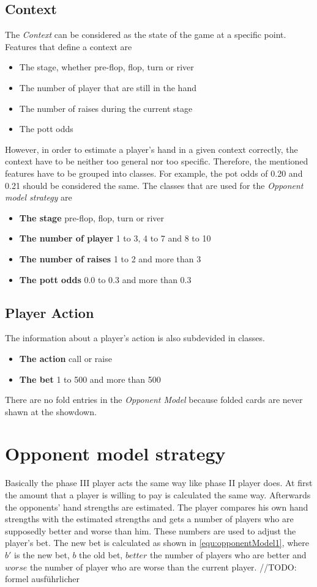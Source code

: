 \subsection{Context}
The \emph{Context} can be considered as the state of the game at a specific point. Features that define a context are 
\begin{itemize}
	\item The stage, whether pre-flop, flop, turn or river
	\item The number of player that are still in the hand
	\item The number of raises during the current stage
	\item The pott odds
\end{itemize}

However, in order to estimate a player's hand in a given context correctly, the context have to be neither too general nor too specific. Therefore, the mentioned features have to be grouped into classes. For example, the pot odds of 0.20 and 0.21 should be considered the same. The classes that are used for the \emph{Opponent model strategy} are 
\begin{itemize}
	\item \textbf{The stage} pre-flop, flop, turn or river
	\item \textbf{The number of player} 1 to 3, 4 to 7 and 8 to 10
	\item \textbf{The number of raises} 1 to 2 and more than 3
	\item \textbf{The pott odds} 0.0 to 0.3 and more than 0.3
\end{itemize}

\subsection{Player Action}
The information about a player's action is also subdevided in classes.
\begin{itemize}
	\item \textbf{The action}  call or raise
	\item \textbf{The bet} 1 to 500 and more than 500
\end{itemize}
There are no fold entries in the \emph{Opponent Model} because folded cards are never shawn at the showdown. 

\section{Opponent model strategy}
Basically the phase III player acts the same way like phase II player does. At first the amount that a player is willing to pay is calculated the same way. Afterwards the opponents' hand strengths are estimated. The player compares his own hand strengths with the estimated strengths and gets a number of players who are supposedly better and worse than him. These numbers are used to adjust the player's bet. The new bet is calculated as shown in \ref{equ:opponentModel1}, where $b'$ is the new bet, $b$ the old bet, $better$ the number of players who are better and $worse$ the number of player who are worse than the current player.
//TODO: formel ausführlicher

